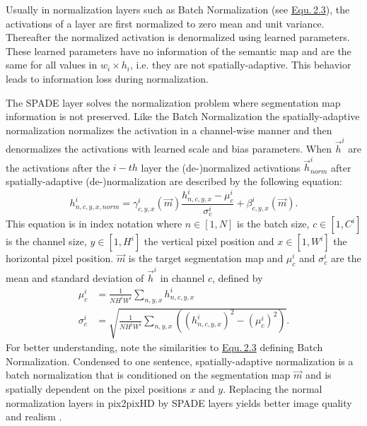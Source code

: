 Usually in normalization layers such as Batch Normalization (see \hyperref[equ:2.3]{Equ.\,2.3}), the activations of a layer are first normalized to zero mean and unit variance. Thereafter the normalized activation is denormalized using learned parameters. These learned parameters have no information of the semantic map and are the same for all values in $w_i\times h_i$, i.e. they are not spatially-adaptive. This behavior leads to information loss during normalization.

The SPADE layer solves the normalization problem where segmentation map information is not preserved. Like the Batch Normalization the spatially-adaptive normalization normalizes the activation in a channel-wise manner and then denormalizes the activations with learned scale and bias parameters. When $\vec{h}^i$ are the activations after the $i{-}th$ layer the (de-)normalized activations $\vec{h}_{norm}^i$ after spatially-adaptive (de-)normalization are described by the following equation:
%
\begin{equation}
    h_{n,c,y,x,norm}^i=\gamma_{c,y,x}^i(\vec{m})\frac{h_{n,c,y,x}^i-\mu_c^i}{\sigma_c^i}+\beta_{c,y,x}^i(\vec{m}).
\end{equation}
%
This equation is in index notation where $n\in [1,N]$ is the batch size, $c\in [1,C^i]$ is the channel size, $y\in [1,H^i]$ the vertical pixel position and $x\in [1,W^i]$ the horizontal pixel position. $\vec{m}$ is the target segmentation map and $\mu_c^i$ and $\sigma_c^i$ are the mean and standard deviation of $\vec{h}^i$ in channel $c$, defined by 
%
\begin{align}
    \mu_c^i&=\frac{1}{NH^iW^i}\sum_{n,y,x}h_{n,c,y,x}^i\\[1ex]
    \sigma_c^i&=\sqrt{\frac{1}{NH^iW^i}\sum_{n,y,x}\left((h_{n,c,y,x}^i)^2-(\mu_c^i)^2\right)}.
\end{align}
%
For better understanding, note the similarities to \hyperref[equ:2.3]{Equ.\,2.3} defining Batch Normalization. Condensed to one sentence, spatially-adaptive normalization is a batch normalization that is conditioned on the segmentation map $\vec{m}$ and is spatially dependent on the pixel positions $x$ and $y$. Replacing the normal normalization layers in pix2pixHD by SPADE layers yields better image quality and realism \cite{spade}.